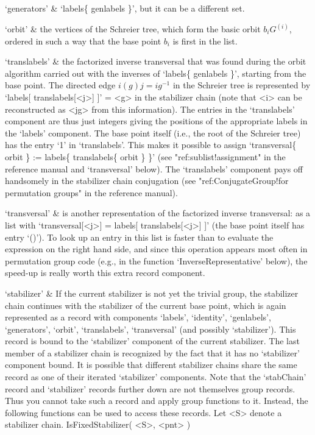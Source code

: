 `generators' &
        `labels\{ genlabels \}', but it can be a different set.

`orbit' &
        the vertices of  the Schreier tree,  which  form the basic  orbit
        $b_iG^{(i)}$, ordered in such a way that the  base point $b_i$ is
        first in the list.

`translabels' &
        the factorized inverse   transversal  that was  found during  the
        orbit  algorithm  carried out   with the   inverses of  `labels\{
        genlabels \}', starting from the base point. The directed edge
	$i(g)j  = ig^{-1}$ in  the Schreier tree  is represented by
        `labels[ translabels[<j>] ]' = <g> in  the stabilizer chain (note
        that <i> can be reconstructed as <jg> from this information). The
        entries in the `translabels'   component are thus   just integers
        giving the  positions of the appropriate   labels in the `labels'
        component. The base point itself (i.e.,  the root of the Schreier
        tree) has the entry `1' in  `translabels'. This makes it possible
        to assign `transversal\{ orbit \} := labels\{ translabels\{ orbit
        \} \}' (see  "ref:sublist!assignment" in the reference manual and
        `transversal'  below).   The `translabels'   component   pays off
        handsomely   in    the   stabilizer    chain   conjugation   (see
        "ref:ConjugateGroup!for permutation      groups" in the reference
        manual).

`transversal' &
        is another  representation of the factorized inverse transversal:
        as a list   with `transversal[<j>] =  labels[ translabels[<j>] ]'
        (the base point  itself has entry `()').  To look up  an entry in
        this list is faster than to evaluate  the expression on the right
        hand side,  and   since this operation   appears  most  often  in
        permutation   group     code    (e.g.,    in      the    function
        `InverseRepresentative' below), the speed-up is really worth this
        extra record component.

`stabilizer' &
        If  the  current stabilizer is  not   yet the trivial  group, the
        stabilizer chain continues with   the stabilizer of  the  current
        base  point,  which is    again  represented as  a   record  with
        components `labels',    `identity',    `genlabels', `generators',
        `orbit',     `translabels',  `transversal'     (and      possibly
        `stabilizer'). This record is bound to the `stabilizer' component
        of the current stabilizer. The last member  of a stabilizer chain
        is recognized  by the fact that  it has no `stabilizer' component
        bound.
\enditems
It is possible that different stabilizer  chains share the same record as
one of their iterated `stabilizer' components.  Note that the `stabChain'
record and `stabilizer'  records further down   are not themselves  group
records. Thus you cannot take such a record and  apply group functions to
it. Instead, the following functions can be used to access these records.
Let <S> denote a stabilizer chain.
\>IsFixedStabilizer( <S>, <pnt> )


